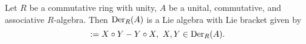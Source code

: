 \begin{corollary}
  Let $R$ be a commutative ring with unity,
  $A$ be a unital, commutative, and associative $R$-algebra.
  Then ${\rm Der}_R(A)$ is a Lie algebra with Lie bracket given by
  \begin{equation}
    [X, Y] := X \circ Y - Y \circ X,\ X, Y \in {\rm Der}_R(A). 
  \end{equation}
\end{corollary}
